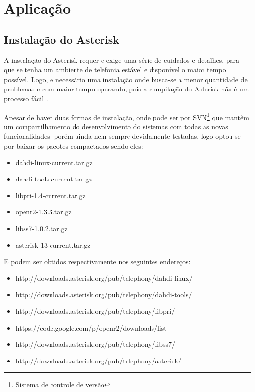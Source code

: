 
\chapter{Aplicação} %
\section{Instalação do Asterisk}
A instalação do Asterisk requer e exige uma série de cuidados e detalhes,  para que se tenha um ambiente de telefonia estável e disponível o maior tempo possível. Logo, e necessário uma instalação onde busca-se a menor quantidade de problemas e com maior tempo operando, pois a compilação do Asterisk não é um processo fácil \cite{alexandrekeller2014}.

Apesar de haver duas formas de instalação, onde pode ser por SVN\footnote{Sistema de controle de versão} que mantêm um compartilhamento do desenvolvimento do sistemas com todas as novas funcionalidades, porém ainda nem sempre devidamente testadas, logo optou-se por baixar os pacotes compactados sendo eles:

\begin{itemize}
  \item dahdi-linux-current.tar.gz
  \item dahdi-tools-current.tar.gz
  \item libpri-1.4-current.tar.gz
  \item openr2-1.3.3.tar.gz
  \item libss7-1.0.2.tar.gz
  \item asterisk-13-current.tar.gz
\end{itemize}

E podem ser obtidos respectivamente nos seguintes endereços:

\begin{itemize}
  \item http://downloads.asterisk.org/pub/telephony/dahdi-linux/
  \item http://downloads.asterisk.org/pub/telephony/dahdi-tools/
  \item http://downloads.asterisk.org/pub/telephony/libpri/
  \item https://code.google.com/p/openr2/downloads/list
  \item http://downloads.asterisk.org/pub/telephony/libss7/
  \item http://downloads.asterisk.org/pub/telephony/asterisk/
\end{itemize}

